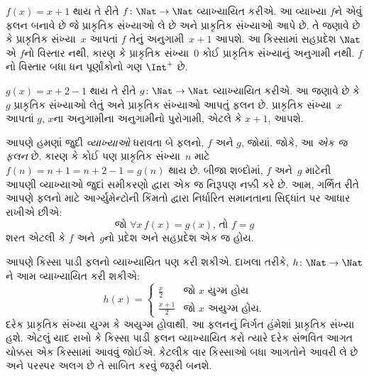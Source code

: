 \begin{ex}
$f(x) = x+1$ થાય તે રીતે $f \colon \Nat \to \Nat$
વ્યાખ્યાયિત કરીએ. આ વ્યાખ્યા $f$ને એવું ફલન બનાવે છે
જે પ્રાકૃતિક સંખ્યાઓ લે છે અને પ્રાકૃતિક સંખ્યાઓ આપે છે.
તે જણાવે છે કે પ્રાકૃતિક સંખ્યા~$x$ આપતાં $f$ તેનું
અનુગામી~$x+1$ આપશે.
આ કિસ્સામાં સહપ્રદેશ $\Nat$ એ $f$નો વિસ્તાર નથી,
કારણ કે પ્રાકૃતિક સંખ્યા~$0$ કોઈ પ્રાકૃતિક સંખ્યાનું
અનુગામી નથી. $f$નો વિસ્તાર બધા ધન પૂર્ણાંકોનો ગણ
$\Int^{+}$ છે.
\end{ex}

\begin{ex}
$g(x) = x+2-1$ થાય તે રીતે $g \colon \Nat \to \Nat$
વ્યાખ્યાયિત કરીએ. આ જણાવે છે કે $g$ પ્રાકૃતિક સંખ્યાઓ
લેતું અને પ્રાકૃતિક સંખ્યાઓ આપતું ફલન છે.
પ્રાકૃતિક સંખ્યા~$x$ આપતાં $g$, $x$ના અનુગામીના
અનુગામીનો પુરોગામી, એટલે કે $x+1$, આપશે.
\end{ex}

\begin{explain}
આપણે હમણાં જુદી \emph{વ્યાખ્યાઓ} ધરાવતા બે ફલનો,
$f$ અને $g$, જોયાં. જોકે, આ \emph{એક જ ફલન} છે.
કારણ કે કોઈ પણ પ્રાકૃતિક સંખ્યા~$n$ માટે
$f(n) = n+1 = n+2-1 =
g(n)$ થાય છે. બીજા શબ્દોમાં, $f$ અને~$g$ માટેની આપણી
વ્યાખ્યાઓ જુદાં સમીકરણો દ્વારા એક જ નિરૂપણ નક્કી કરે છે.
આમ, ગર્ભિત રીતે આપણે ફલનો માટે આર્ગ્યુમેન્ટોની કિંમતો દ્વારા
નિર્ધારિત સમાનતાના સિદ્ધાંત પર આધાર રાખીએ છીએ:
\[
  \text{જો }\forall x\, f(x) = g(x)\text{, તો }f = g
\]
શરત એટલી કે $f$ અને~$g$નો પ્રદેશ અને સહપ્રદેશ એક જ હોય.
\end{explain}

\begin{ex}
આપણે કિસ્સા પાડી ફલનો વ્યાખ્યાયિત પણ કરી શકીએ.
દાખલા તરીકે, $h \colon \Nat \to \Nat$ને આમ વ્યાખ્યાયિત
કરી શકીએ:
\[
h(x) =
\begin{cases}
  \frac{x}{2} & \text{જો $x$ યુગ્મ હોય} \\
  \frac{x+1}{2} & \text{જો $x$ અયુગ્મ હોય.}
\end{cases}
\]
દરેક પ્રાકૃતિક સંખ્યા યુગ્મ કે અયુગ્મ હોવાથી, આ ફલનનું
નિર્ગત હંમેશાં પ્રાકૃતિક સંખ્યા હશે. એટલું યાદ રાખો કે
કિસ્સા પાડી ફલન વ્યાખ્યાયિત કરો ત્યારે દરેક સંભવિત
આગત ચોક્કસ એક કિસ્સામાં આવવું જોઈએ. કેટલીક વાર
કિસ્સાઓ બધા આગતોને આવરી લે છે અને પરસ્પર અલગ છે
તે સાબિત કરવું જરૂરી બનશે.
\end{ex}
\endgroup


